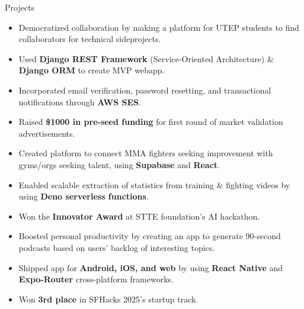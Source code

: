 \documentclass{resume} %
\begin{document}
\begin{workSection}{Projects}
	
	\customItem[
	title=\href{https://github.com/AshkanArabim/hackerhunt}{hackerhunt.tech \faExternalLink},
	duration=Solo | January 2025 - present,
	]
	\begin{itemize}
		\vspace{-0.5em}
		\itemsep -6pt {}
		\item Democratized collaboration by making a platform for UTEP students to find collaborators for technical sideprojects. 
		\item Used \textbf{Django REST Framework} (Service-Oriented Architecture) \& \textbf{Django ORM} to create MVP webapp.
		\item Incorporated email verification, password resetting, and transactional notifications through \textbf{AWS SES}.
		\item Raised \textbf{\$1000 in pre-seed funding} for first round of market validation advertisements.
	\end{itemize}
	
	\customItem[
	title=Athlytix,
	duration=Team of 4 | April 2025 - May 2025,
	]
	\begin{itemize}
		\vspace{-0.5em}
		\itemsep -6pt {}
		\item Created platform to connect MMA fighters seeking improvement with gyms/orgs seeking talent, using \textbf{Supabase} and \textbf{React}.
		\item Enabled scalable extraction of statistics from training \& fighting videos by using \textbf{Deno serverless functions}.
		\item Won the \textbf{Innovator Award} at STTE foundation's AI hackathon.
	\end{itemize}

	\customItem[
	title=\href{https://github.com/chesterCaii/back-logz/}{Backlogz \faExternalLink}, %
	duration=Team of 4 | April 2025,
	]
	\begin{itemize}
		\vspace{-0.5em}
		\itemsep -6pt {}
		\item Boosted personal productivity by creating an app to generate 90-second podcasts based on users' backlog of interesting topics.
		\item Shipped app for \textbf{Android, iOS, and web} by using \textbf{React Native} and \textbf{Expo-Router} cross-platform frameworks.
		\item Won \textbf{3rd place} in SFHacks 2025's startup track.
	\end{itemize}
	

\end{workSection}
\end{document}

